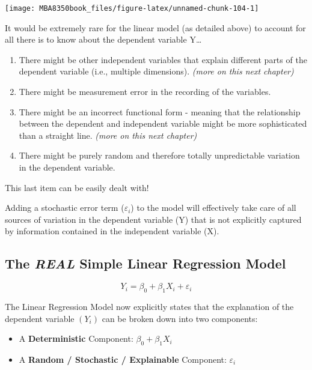 \documentclass[
]{book}
\begin{document}
\begin{center}\texttt{[image: MBA8350book\_files/figure-latex/unnamed-chunk-104-1]} \end{center}

It would be extremely rare for the linear model (as detailed above) to account for all there is to know about the dependent variable Y\ldots{}

\begin{enumerate}
\def\labelenumi{\arabic{enumi}.}
\item
  There might be other independent variables that explain different parts of the dependent variable (i.e., multiple dimensions). \emph{(more on this next chapter)}
\item
  There might be measurement error in the recording of the variables.
\item
  There might be an incorrect functional form - meaning that the relationship between the dependent and independent variable might be more sophisticated than a straight line. \emph{(more on this next chapter)}
\item
  There might be purely random and therefore totally unpredictable variation in the dependent variable.
\end{enumerate}

This last item can be easily dealt with!

Adding a stochastic error term (\(\varepsilon_i\)) to the model will effectively take care of all sources of variation in the dependent variable (Y) that is not explicitly captured by information contained in the independent variable (X).

\hypertarget{the-real-simple-linear-regression-model}{%
\subsection{\texorpdfstring{The \emph{REAL} Simple Linear Regression Model}{The REAL Simple Linear Regression Model}}\label{the-real-simple-linear-regression-model}}

\[Y_i=\beta_0+\beta_1X_i+\varepsilon_i\]

The Linear Regression Model now explicitly states that the explanation of the dependent variable \((Y_i)\) can be broken down into two components:

\begin{itemize}
\item
  A \textbf{Deterministic} Component: \(\beta_0+\beta_1X_i\)
\item
  A \textbf{Random / Stochastic / Explainable} Component: \(\varepsilon_i\)
\end{itemize}
\end{document}
